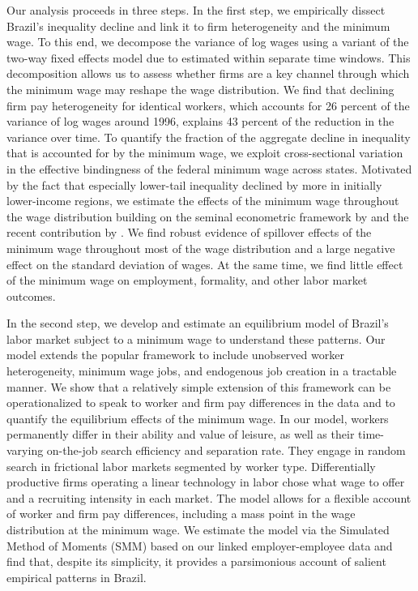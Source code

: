 Our analysis proceeds in three steps. In the first step, we empirically dissect Brazil's inequality decline and link it to firm heterogeneity and the minimum wage. To this end, we decompose the variance of log wages using a variant of the two-way fixed effects model due to \citet*[][henceforth AKM]{abowdkramarzmargolis1999} estimated within separate time windows. This decomposition allows us to assess whether firms are a key channel through which the minimum wage may reshape the wage distribution. We find that declining firm pay heterogeneity for identical workers, which accounts for 26 percent of the variance of log wages around 1996, explains 43 percent of the reduction in the variance over time. To quantify the fraction of the aggregate decline in inequality that is accounted for by the minimum wage, we exploit cross-sectional variation in the effective bindingness of the federal minimum wage across states. Motivated by the fact that especially lower-tail inequality declined by more in initially lower-income regions, we estimate the effects of the minimum wage throughout the wage distribution building on the seminal econometric framework by \citet{Lee1999} and the recent contribution by \citet{Autor2016}. We find robust evidence of spillover effects of the minimum wage throughout most of the wage distribution and a large negative effect on the standard deviation of wages. At the same time, we find little effect of the minimum wage on employment, formality, and other labor market outcomes.

In the second step, we develop and estimate an equilibrium model of Brazil's labor market subject to a minimum wage to understand these patterns. Our model extends the popular \citet{BurdettMortensen1998} framework to include unobserved worker heterogeneity, minimum wage jobs, and endogenous job creation in a tractable manner. We show that a relatively simple extension of this framework can be operationalized to speak to worker and firm pay differences in the data and to quantify the equilibrium effects of the minimum wage. In our model, workers permanently differ in their ability and value of leisure, as well as their time-varying on-the-job search efficiency and separation rate. They engage in random search in frictional labor markets segmented by worker type. Differentially productive firms operating a linear technology in labor chose what wage to offer and a recruiting intensity in each market. The model allows for a flexible account of worker and firm pay differences, including a mass point in the wage distribution at the minimum wage. We estimate the model via the Simulated Method of Moments (SMM) based on our linked employer-employee data and find that, despite its simplicity, it provides a parsimonious account of salient empirical patterns in Brazil.

